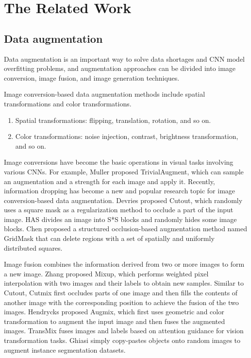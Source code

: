 \documentclass[sn-mathphys]{sn-jnl}%
\theoremstyle{thmstyleone}%
\theoremstyle{thmstyletwo}%
\theoremstyle{thmstylethree}%
\begin{document}
\section{The Related Work}\label{sec:rel}
\subsection{Data augmentation}
Data augmentation is an important way to solve data shortages and CNN model overfitting problems, and augmentation approaches can be divided into image conversion, image fusion, and image generation techniques.

Image conversion-based data augmentation methods include spatial transformations and color transformations.
\begin{enumerate}[1)]
\item Spatial transformations: flipping, translation, rotation, and so on.
\item Color transformations: noise injection, contrast, brightness transformation, and so on.
\end{enumerate}
Image conversions have become the basic operations in visual tasks involving various CNNs. For example, Muller \cite{muller2021trivialaugment} proposed TrivialAugment, which can sample an augmentation and a strength for each image and apply it.
Recently, information dropping has become a 
new and popular research topic 
for image conversion-based data augmentation.
Devries \cite{devries2017improved} proposed Cutout, which randomly uses a square mask as a regularization method to occlude a part of the input image.
HAS \cite{singh2017hide} divides an image into S*S blocks and randomly hides some image blocks.
Chen \cite{chen2020gridmask} proposed a structured occlusion-based augmentation method named GridMask that can delete regions with a set of spatially and uniformly distributed squares.

Image fusion combines the information derived from two or more images to form a new image.
Zhang \cite{zhang2017mixup} proposed Mixup, which performs weighted pixel interpolation with two images and their labels to obtain new samples.
Similar to Cutout, Cutmix \cite{yun2019cutmix} first occludes parts of one image and then fills the contents of another image with the corresponding position to achieve the fusion of the two images.
Hendrycks \cite{hendrycks2019augmix} proposed Augmix, which first uses geometric and color transformation to augment the input image and then fuses the augmented images.
TransMix \cite{chen2021transmix} fuses images and labels based on attention guidance for vision transformation tasks.
Ghiasi \cite{ghiasi2021simple} simply copy-pastes objects onto random images to augment instance segmentation datasets.
\end{document}
